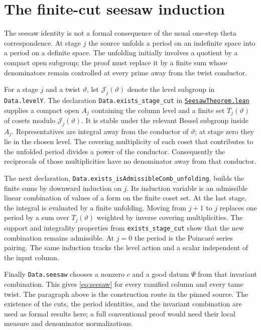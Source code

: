 \documentclass[11pt,oneside,openany]{amsbook}
\theoremstyle{remark}
\numberwithin{equation}{section}
\newcommand{\ghroot}{https://github.com/lsernau/grh-lean/blob/}
\newcommand{\ghrev}{72fead102f663d5c7a407964a13dc0cf9d977207}
\newcommand{\leanfile}[2]{%
  \href{\ghroot\ghrev/grh-compact/src/#1}{\nolinkurl{#2}}}
\begin{document}
\section{The finite-cut seesaw induction}
\label{sec:finite-cut}
The seesaw identity is not a formal consequence of the
usual one-step theta correspondence. At stage $j$ the
source unfolds a period on an indefinite space into a
period on a definite space. The unfolding initially
involves a quotient by a compact open subgroup; the proof
must replace it by a finite sum whose denominators remain
controlled at every prime away from the twist conductor.

For a stage $j$ and a twist $\vartheta$, let
$\mathcal J_j(\vartheta)$ denote the level subgroup in
\texttt{Data.levelY}. The declaration
\texttt{Data.exists\_stage\_cut} in
\leanfile{New/Seesaw/SeesawTheorem.lean}%
{SeesawTheorem.lean} supplies a compact open $A_j$
containing the column level and a finite set
$T_j(\vartheta)$ of cosets modulo
$\mathcal J_j(\vartheta)$. It is stable under the
relevant Bessel subgroup inside $A_j$. Representatives
are integral away from the conductor of $\vartheta$;
at stage zero they lie in the chosen level. The
covering multiplicity of each coset that contributes
to the unfolded period divides a power of the conductor.
Consequently the reciprocals of those multiplicities
have no denominator away from that conductor.

The next declaration,
\texttt{Data.exists\_isAdmissibleComb\_unfolding},
builds the finite sums by downward induction on $j$.
Its induction variable is an admissible linear combination
of values of a form on the finite coset set. At the
last stage, the integral is evaluated by a finite
unfolding. Moving from $j+1$ to $j$ replaces one period
by a sum over $T_j(\vartheta)$ weighted by inverse
covering multiplicities. The support and integrality
properties from \texttt{exists\_stage\_cut} show that
the new combination remains admissible. At $j=0$ the
period is the Poincar\'e series pairing. The same
induction tracks the level action and a scalar independent
of the input column.

Finally \texttt{Data.seesaw} chooses a nonzero $c$ and
a good datum $\Psi$ from that invariant combination.
This gives \eqref{eq:seesaw} for every ramified column
and every tame twist. The paragraph above is the
construction route in the pinned source. The existence
of the cuts, the period identities, and the invariant
combination are used as formal results here; a full
conventional proof would need their local measure and
denominator normalizations.
\end{document}
